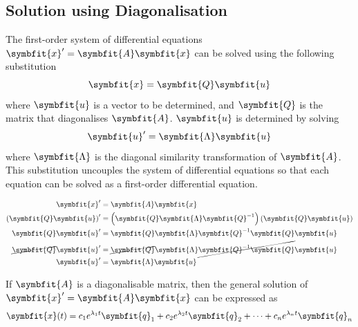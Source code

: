 \documentclass{article}
\begin{document}
\subsection{Solution using Diagonalisation}
\begin{theorem}
    The first-order system of differential equations
    \(\symbfit{x}' = \symbfit{A} \symbfit{x}\) can be solved using the
    following substitution
    \begin{equation*}
        \symbfit{x}=\symbfit{Q}\symbfit{u}
    \end{equation*}
    where \(\symbfit{u}\) is a vector to be determined, and
    \(\symbfit{Q}\) is the matrix that diagonalises \(\symbfit{A}\).
    \(\symbfit{u}\) is determined by solving
    \begin{equation*}
        \symbfit{u}' = \symbfit{\Lambda} \symbfit{u}
    \end{equation*}
    where \(\symbfit{\Lambda}\) is the diagonal similarity
    transformation of \(\symbfit{A}\). This substitution uncouples the
    system of differential equations so that each equation can be solved
    as a first-order differential equation.
\end{theorem}
\begin{solutionF}[Proof]
    \begingroup
    \allowdisplaybreaks
    \begin{align*}
        \symbfit{x}'                           & = \symbfit{A} \symbfit{x}                                                                           \\
        \left( \symbfit{Q}\symbfit{u} \right)' & = \left( \symbfit{Q}\symbfit{\Lambda} \symbfit{Q}^{-1} \right)\left( \symbfit{Q}\symbfit{u} \right) \\
        \symbfit{Q}\symbfit{u}'                & = \symbfit{Q}\symbfit{\Lambda} \symbfit{Q}^{-1} \symbfit{Q}\symbfit{u}                              \\
        \cancel{\symbfit{Q}}\symbfit{u}'       & = \cancel{\symbfit{Q}}\symbfit{\Lambda} \cancel{\symbfit{Q}^{-1} \symbfit{Q}}\symbfit{u}            \\
        \symbfit{u}'                           & = \symbfit{\Lambda} \symbfit{u}
    \end{align*}
    \endgroup
\end{solutionF}
\begin{theorem}
    If \(\symbfit{A}\) is a diagonalisable matrix, then the general
    solution of \(\symbfit{x}' = \symbfit{A} \symbfit{x}\) can be
    expressed as
    \begin{equation*}
        \symbfit{x}(t) = c_1 e^{\lambda_1 t} \symbfit{q}_1 + c_2 e^{\lambda_2 t} \symbfit{q}_2 + \cdots + c_n e^{\lambda_n t} \symbfit{q}_n
    \end{equation*}
\end{theorem}
\end{document}
